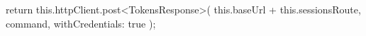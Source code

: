 \begin{spverbatim}
    return this.httpClient.post<TokensResponse>(
        this.baseUrl + this.sessionsRoute,
        command,
        { withCredentials: true });
\end{spverbatim}